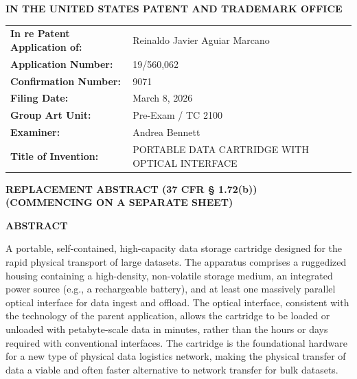 \documentclass[11pt,letterpaper]{article}
\begin{document}
\thispagestyle{empty}

\begin{center}
    \large\textbf{IN THE UNITED STATES PATENT AND TRADEMARK OFFICE} \\
\end{center}

\vspace{0.2cm}
\noindent\begin{tabular}{p{2.3in}p{4.0in}}
\textbf{In re Patent Application of:} & Reinaldo Javier Aguiar Marcano \\
\textbf{Application Number:} & 19/560,062 \\
\textbf{Confirmation Number:} & 9071 \\
\textbf{Filing Date:} & March 8, 2026 \\
\textbf{Group Art Unit:} & Pre-Exam / TC 2100 \\
\textbf{Examiner:} & Andrea Bennett \\
\textbf{Title of Invention:} & PORTABLE DATA CARTRIDGE WITH OPTICAL INTERFACE \\
\end{tabular}

\vspace{0.6cm}
\begin{center}
    \textbf{\large REPLACEMENT ABSTRACT (37 CFR \S{} 1.72(b))} \\
    \textbf{(COMMENCING ON A SEPARATE SHEET)}
\end{center}

\vspace{0.4cm}

\begin{center}
    \textbf{ABSTRACT}
\end{center}

A portable, self-contained, high-capacity data storage cartridge designed for the rapid physical transport of large datasets. The apparatus comprises a ruggedized housing containing a high-density, non-volatile storage medium, an integrated power source (e.g., a rechargeable battery), and at least one massively parallel optical interface for data ingest and offload. The optical interface, consistent with the technology of the parent application, allows the cartridge to be loaded or unloaded with petabyte-scale data in minutes, rather than the hours or days required with conventional interfaces. The cartridge is the foundational hardware for a new type of physical data logistics network, making the physical transfer of data a viable and often faster alternative to network transfer for bulk datasets.
\end{document}
